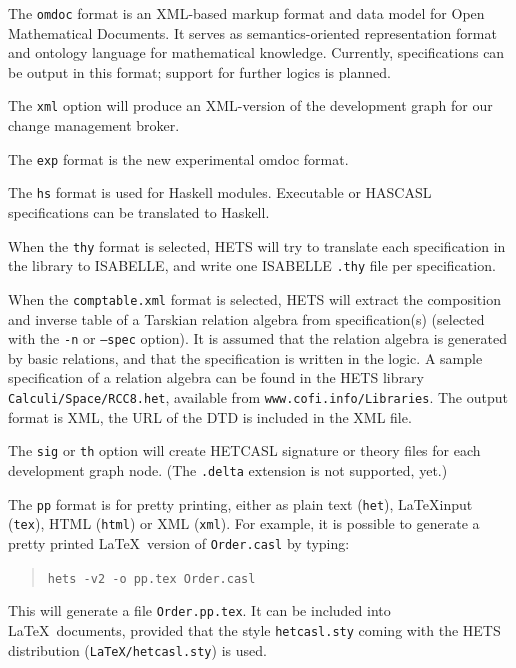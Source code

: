 \documentclass{article}
\newcommand{\normalTEXTSC}[2]{{#1\scriptsize#2}}
\newcommand     {\Hets}{\normalTEXTSC{H}{ETS}\xspace}
\newcommand     {\Isabelle}{\normalTEXTSC{I}{SABELLE}\xspace}
\newcommand     {\HasCASL}{\normalTEXTSC{H}{AS}\normalTEXTSC{C}{ASL}\xspace}
\newcommand{\HetCASL}{\normalTEXTSC{H}{ET}\normalTEXTSC{C}{ASL}\xspace}
\begin{document}
\begin{description}
The \texttt{omdoc} format \cite{books/sp/Kohlhase06} is an XML-based
markup format and data model for Open Mathematical Documents. It
serves as semantics-oriented representation format and ontology
language for mathematical knowledge. Currently, \CASL specifications
can be output in this format; support for further logics is planned.

The \texttt{xml} option will produce an XML-version of the development graph
for our change management broker.

The \texttt{exp} format is the new experimental omdoc format.

The \texttt{hs} format is used for Haskell modules. Executable \CASL or
\HasCASL specifications can be translated to Haskell.

When the \texttt{thy} format is selected, \Hets will try to translate
each specification in the library to \Isabelle, and write one \Isabelle
\texttt{.thy} file per specification.

When the \texttt{comptable.xml} format is selected, \Hets will extract
the composition and inverse table of a Tarskian relation algebra from
specification(s) (selected with the \texttt{-n} or \texttt{--spec}
option). It is assumed that the relation algebra is
generated by basic relations, and that the specification is written
in the \CASL logic. A sample specification of a relation
algebra can be found in the \Hets library \texttt{Calculi/Space/RCC8.het},
available from \texttt{www.cofi.info/Libraries}.
The output format is XML, the URL of the DTD is included in the
XML file.

The \texttt{sig} or \texttt{th} option will create \HetCASL signature or
theory files for each development graph node. (The \texttt{.delta} extension
is not supported, yet.)

The \texttt{pp} format is for pretty printing, either as plain text
(\texttt{het}), \LaTeX input (\texttt{tex}), HTML (\texttt{html}) or XML
(\texttt{xml}).  For example, it is possible to generate a pretty printed
\LaTeX\ version of \texttt{Order.casl} by typing:

\begin{quote}
\texttt{hets -v2 -o pp.tex Order.casl}
\end{quote}

This will generate a file \texttt{Order.pp.tex}. It can be included
into \LaTeX\ documents, provided that the style \texttt{hetcasl.sty}
coming with the \Hets distribution (\texttt{LaTeX/hetcasl.sty}) is used.


\end{description}
\end{document}
